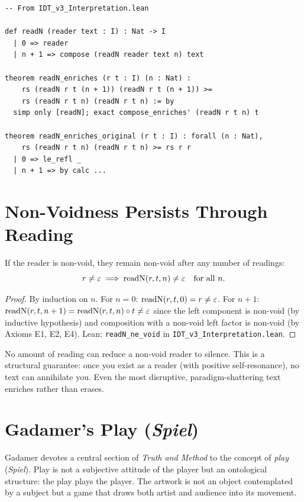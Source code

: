 \begin{lstlisting}
-- From IDT_v3_Interpretation.lean

def readN (reader text : I) : Nat -> I
  | 0 => reader
  | n + 1 => compose (readN reader text n) text

theorem readN_enriches (r t : I) (n : Nat) :
    rs (readN r t (n + 1)) (readN r t (n + 1)) >=
    rs (readN r t n) (readN r t n) := by
  simp only [readN]; exact compose_enriches' (readN r t n) t

theorem readN_enriches_original (r t : I) : forall (n : Nat),
    rs (readN r t n) (readN r t n) >= rs r r
  | 0 => le_refl _
  | n + 1 => by calc ...
\end{lstlisting}

\section{Non-Voidness Persists Through Reading}

\begin{theorem}
\label{thm:non-void-persists}
If the reader is non-void, they remain non-void after any number of readings:
\[
r \neq \varepsilon \implies \mathrm{readN}(r, t, n) \neq \varepsilon \quad \text{for all } n.
\]
\end{theorem}

\begin{proof}
By induction on $n$. For $n = 0$: $\mathrm{readN}(r,t,0) = r \neq \varepsilon$.
For $n+1$: $\mathrm{readN}(r,t,n+1) = \mathrm{readN}(r,t,n) \circ t \neq \varepsilon$
since the left component is non-void (by inductive hypothesis) and composition
with a non-void left factor is non-void (by Axioms E1, E2, E4).
Lean: \texttt{readN\_ne\_void} in \texttt{IDT\_v3\_Interpretation.lean}.
\end{proof}

\begin{interpretation}
No amount of reading can reduce a non-void reader to silence. This is a
structural guarantee: once you exist as a reader (with positive self-resonance),
no text can annihilate you. Even the most disruptive, paradigm-shattering text
enriches rather than erases.
\end{interpretation}

\section{Gadamer's Play (\textit{Spiel})}

Gadamer devotes a central section of \textit{Truth and Method} to the concept
of \emph{play} (\textit{Spiel}). Play is not a subjective attitude of the
player but an ontological structure: the play plays the player. The artwork
is not an object contemplated by a subject but a game that draws both artist
and audience into its movement.

